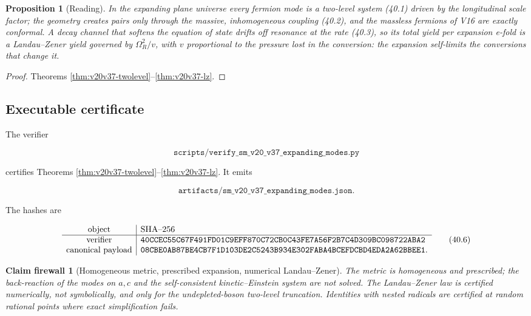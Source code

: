 \documentclass[11pt]{article}
\newtheorem{proposition}[theorem]{Proposition}
\newtheorem{firewall}[theorem]{Claim firewall}
\theoremstyle{remark}
\begin{document}
\begin{proposition}[Reading]
\label{prop:v20v37-reading}
In the expanding plane universe every fermion mode is a two-level
system (40.1) driven by the longitudinal scale factor; the geometry
creates pairs only through the massive, inhomogeneous coupling
(40.2), and the massless fermions of V16 are exactly conformal.  A
decay channel that softens the equation of state drifts off
resonance at the rate (40.3), so its total yield per expansion
e-fold is a Landau--Zener yield governed by \(\Omega_R^2/v\), with
\(v\) proportional to the pressure lost in the conversion: the
expansion self-limits the conversions that change it.
\end{proposition}

\begin{proof}
Theorems \ref{thm:v20v37-twolevel}--\ref{thm:v20v37-lz}.
\end{proof}

\subsection{Executable certificate}

The verifier

\[
 \texttt{scripts/verify\_sm\_v20\_v37\_expanding\_modes.py}           \tag{40.4}
\]

certifies Theorems \ref{thm:v20v37-twolevel}--\ref{thm:v20v37-lz}.
It emits

\[
 \texttt{artifacts/sm\_v20\_v37\_expanding\_modes.json}.              \tag{40.5}
\]

The hashes are

\[
\begin{array}{c|l}
\hbox{object}&\hbox{SHA--256}\\ \hline
\hbox{verifier}&
\texttt{40CCEC55C67F491FD01C9EFF870C72CB0C43FE7A56F2B7C4D309BC098722ABA2}\\
\hbox{canonical payload}&
\texttt{08CBE0AB87BE4CB7F1D103DE2C5243B934E302FABA4BCEFDCBD4EDA2A62BBEE1}.
\end{array}                                                     \tag{40.6}
\]

\begin{firewall}[Homogeneous metric, prescribed expansion, numerical Landau--Zener]
\label{fire:v20v37}
The metric is homogeneous and prescribed; the back-reaction of the
modes on \(a,c\) and the self-consistent kinetic--Einstein system are
not solved.  The Landau--Zener law is certified numerically, not
symbolically, and only for the undepleted-boson two-level
truncation.  Identities with nested radicals are certified at random
rational points where exact simplification fails.
\end{firewall}
\end{document}
